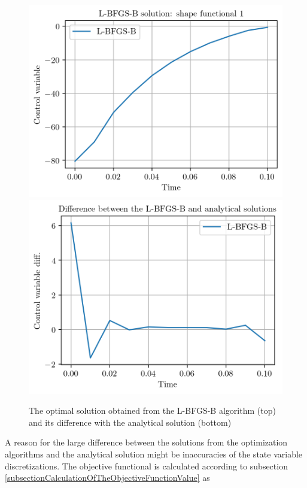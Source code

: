 \begin{figure}
\centering
\includegraphics{Plots/LBFGSBControlVector.png}
\includegraphics{Plots/LBFGSBDiffer.png}
\caption{\label{LBFGSBSolutionComp}The optimal solution obtained from the L-BFGS-B algorithm (top) and its difference with the analytical solution (bottom)}
\end{figure}

A reason for the large difference between the solutions from the optimization algorithms and the analytical solution might be inaccuracies of the state variable discretizations. The objective functional is calculated according to subsection \ref{subsectionCalculationOfTheObjectiveFunctionValue} as

